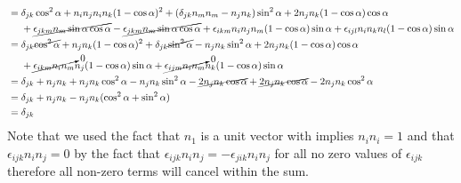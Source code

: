 \documentclass[11pt]{article}
\numberwithin{equation}{section}
\begin{document}
\begin{enumerate}[(a)]
\begin{align*}
                     &= \delta_{jk}\cos^2\alpha + n_{i}n_{j}n_{i}n_{k}(1-\cos\alpha)^2 + (\delta_{jk}n_mn_m-n_jn_k)\sin^2\alpha + 2n_jn_k(1-\cos\alpha)\cos\alpha \\
                     & \ \ \ \ + \cancel{\epsilon_{jkm}n_m\sin\alpha\cos\alpha} - \cancel{\epsilon_{jkm}n_m\sin\alpha\cos\alpha} + \epsilon_{ikm}n_{i}n_{j}n_m(1-\cos\alpha)\sin\alpha + \epsilon_{ijl}n_in_{k}n_{l}(1-\cos\alpha)\sin\alpha \\
                     &= \delta_{jk}\cancel{\cos^2\alpha} + n_{j}n_{k}(1-\cos\alpha)^2 + \delta_{jk}\cancel{\sin^2\alpha}-n_jn_k\sin^2\alpha + 2n_jn_k(1-\cos\alpha)\cos\alpha \\
                     & \ \ \ \ +  \cancelto{0}{\epsilon_{ikm}n_{i}n_{m}}n_j(1-\cos\alpha)\sin\alpha +\cancelto{0}{\epsilon_{ijm}n_in_{m}}n_{k}(1-\cos\alpha)\sin\alpha \\
                     &= \delta_{jk} + n_{j}n_{k} + n_jn_k\cos^2\alpha - n_jn_k\sin^2\alpha - \cancel{2n_jn_k\cos\alpha} +  \cancel{2n_jn_k\cos\alpha} - 2n_jn_k\cos^2\alpha\\
                     &= \delta_{jk} + n_{j}n_{k} - n_jn_k(\cos^2\alpha + \sin^2\alpha)\\
                     &= \delta_{jk}
    \end{align*}
    Note that we used the fact that $n_1$ is a unit vector with implies $n_in_i = 1$ and that 
    $\epsilon_{ijk}n_in_j=0$ by the fact that $\epsilon_{ijk}n_in_j = -\epsilon_{jik}n_in_j$ for all no zero values
    of $\epsilon_{ijk}$ therefore all non-zero terms will cancel within the sum.


\end{enumerate}
\end{document}
